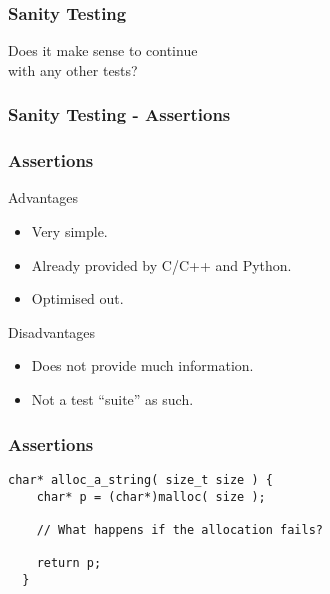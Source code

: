 \begin{frame}
  \frametitle{Sanity Testing}
  \begin{center}
    {\LARGE\color{Base09}Does it make sense to continue \\with any other tests?}
  \end{center}
\end{frame}

\begin{frame}
  \frametitle{Sanity Testing - Assertions}
\end{frame}

\begin{frame}
  \frametitle{Assertions}
  \begin{block}{Advantages}
    \begin{itemize}
    \item Very simple.
    \item Already provided by C/C++ and Python.
    \item Optimised out.
    \end{itemize}
  \end{block}
  \begin{block}{Disadvantages}
    \begin{itemize}
    \item Does not provide much information.
    \item Not a test ``suite'' as such.
    \end{itemize}
  \end{block}
\end{frame}

\begin{frame}[fragile]
  \frametitle{Assertions}
  \begin{example}
    \begin{lstlisting}[style=C]
  char* alloc_a_string( size_t size ) {
    char* p = (char*)malloc( size );

    // What happens if the allocation fails?

    return p;
  }
    \end{lstlisting}
  \end{example}
\end{frame}

